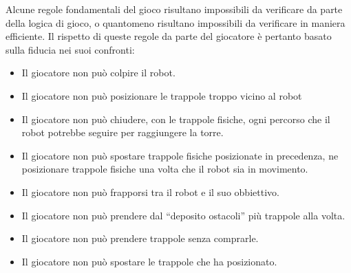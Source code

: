 Alcune regole fondamentali del gioco risultano impossibili da verificare da parte della logica di gioco, o quantomeno risultano impossibili da verificare in maniera efficiente. Il rispetto di queste regole da parte del giocatore è pertanto basato sulla fiducia nei suoi confronti:
	\begin{itemize}
	\item Il giocatore non può colpire il robot.
	\item Il giocatore non può posizionare le trappole troppo vicino al robot
	\item Il giocatore non può chiudere, con le trappole fisiche, ogni percorso che il robot potrebbe seguire per raggiungere la torre.
	\item Il giocatore non può spostare trappole fisiche posizionate in precedenza, ne posizionare trappole fisiche una volta che il robot sia in movimento.
	\item Il giocatore non può frapporsi tra il robot e il suo obbiettivo.
	\item Il giocatore non può prendere dal “deposito ostacoli” più trappole alla volta.
	\item Il giocatore non può prendere trappole senza comprarle.
	\item Il giocatore non può spostare le trappole che ha posizionato.
	\end{itemize}